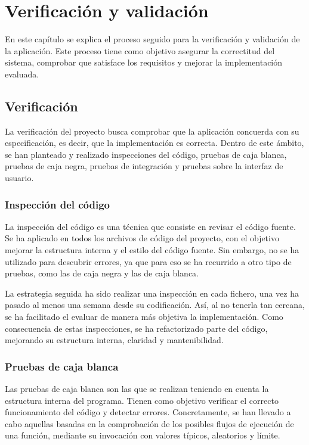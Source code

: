 \chapter{Verificación y validación\label{cap:pruebas}}

En este capítulo se explica el proceso seguido para la verificación y validación de la aplicación.
Este proceso tiene como objetivo asegurar la correctitud del sistema, comprobar que satisface los requisitos y mejorar la implementación evaluada.

\section{Verificación\label{sec:pb:verificacion}}

La verificación del proyecto busca comprobar que la aplicación concuerda con su especificación, es decir, que la implementación es correcta.
Dentro de este ámbito, se han planteado y realizado inspecciones del código, pruebas de caja blanca, pruebas de caja negra, pruebas de integración y pruebas sobre la interfaz de usuario.

\subsection*{Inspección del código\label{ssec:pb:inspeccion}}

La inspección del código es una técnica que consiste en revisar el código fuente.
Se ha aplicado en todos los archivos de código del proyecto, con el objetivo mejorar la estructura interna y el estilo del código fuente.
Sin embargo, no se ha utilizado para descubrir errores, ya que para eso se ha recurrido a otro tipo de pruebas, como las de caja negra y las de caja blanca.

La estrategia seguida ha sido realizar una inspección en cada fichero, una vez ha pasado al menos una semana desde su codificación.
Así, al no tenerla tan cercana, se ha facilitado el evaluar de manera más objetiva la implementación.
Como consecuencia de estas inspecciones, se ha refactorizado parte del código, mejorando su estructura interna, claridad y mantenibilidad.

\subsection*{Pruebas de caja blanca\label{ssec:pb:caja_blanca}}

Las pruebas de caja blanca son las que se realizan teniendo en cuenta la estructura interna del programa.
Tienen como objetivo verificar el correcto funcionamiento del código y detectar errores.
Concretamente, se han llevado a cabo aquellas basadas en la comprobación de los posibles flujos de ejecución de una función, mediante su invocación con valores típicos, aleatorios y límite.

